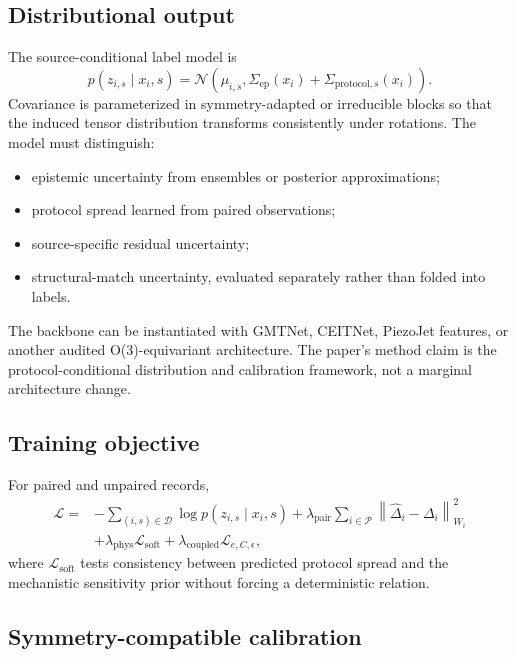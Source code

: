 \documentclass[11pt]{article}
\newcommand{\norm}[1]{\left\lVert #1 \right\rVert}
\begin{document}
\subsection{Distributional output}

The source-conditional label model is
\begin{equation}
p(z_{i,s}\mid x_i,s)
=
\mathcal N\!\left(
\mu_{i,s},
\Sigma_{\mathrm{ep}}(x_i)
+
\Sigma_{\mathrm{protocol},s}(x_i)
\right).
\label{eq:likelihood}
\end{equation}
Covariance is parameterized in symmetry-adapted or irreducible blocks so that the induced tensor distribution transforms consistently under rotations. The model must distinguish:
\begin{itemize}[leftmargin=1.5em]
    \item epistemic uncertainty from ensembles or posterior approximations;
    \item protocol spread learned from paired observations;
    \item source-specific residual uncertainty;
    \item structural-match uncertainty, evaluated separately rather than folded into labels.
\end{itemize}

The backbone can be instantiated with GMTNet, CEITNet, PiezoJet features, or another audited O(3)-equivariant architecture. The paper's method claim is the protocol-conditional distribution and calibration framework, not a marginal architecture change.

\subsection{Training objective}

For paired and unpaired records,
\begin{align}
\mathcal L
=&
-\sum_{(i,s)\in\mathcal D}
\log p(z_{i,s}\mid x_i,s)
+
\lambda_{\mathrm{pair}}
\sum_{i\in\mathcal P}
\norm{\widehat\Delta_i-\Delta_i}_{W_i}^{2}
\nonumber\\
&+
\lambda_{\mathrm{phys}}
\mathcal L_{\mathrm{soft}}
+
\lambda_{\mathrm{coupled}}
\mathcal L_{e,C,\epsilon},
\end{align}
where $\mathcal L_{\mathrm{soft}}$ tests consistency between predicted protocol spread and the mechanistic sensitivity prior without forcing a deterministic relation.

\subsection{Symmetry-compatible calibration}
\end{document}
